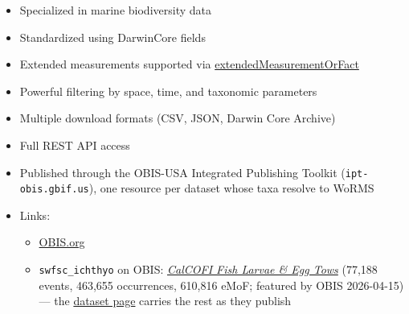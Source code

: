 \documentclass[
  letterpaper,
  DIV=11,
  numbers=noendperiod]{scrreprt}
\providecommand{\tightlist}{%
  \setlength{\itemsep}{0pt}\setlength{\parskip}{0pt}}
\begin{document}
\begin{itemize}
\tightlist
\item
  Specialized in marine biodiversity data
\item
  Standardized using DarwinCore fields
\item
  Extended measurements supported via
  \href{https://manual.obis.org/format_emof.html}{extendedMeasurementOrFact}
\item
  Powerful filtering by space, time, and taxonomic parameters
\item
  Multiple download formats (CSV, JSON, Darwin Core Archive)
\item
  Full REST API access
\item
  Published through the OBIS-USA Integrated Publishing Toolkit
  (\texttt{ipt-obis.gbif.us}), one resource per dataset whose taxa
  resolve to WoRMS
\item
  Links:

  \begin{itemize}
  \tightlist
  \item
    \href{https://obis.org}{OBIS.org}
  \item
    \texttt{swfsc\_ichthyo} on OBIS:
    \href{https://obis.org/dataset/0e223f55-c826-4513-ae9a-b04cbf2e189c}{\emph{CalCOFI
    Fish Larvae \& Egg Tows}} (77,188 events, 463,655 occurrences,
    610,816 eMoF; featured by OBIS 2026-04-15) --- the
    \href{https://calcofi.io/datasets/swfsc_ichthyo/}{dataset page}
    carries the rest as they publish
  \end{itemize}
\end{itemize}
\end{document}
